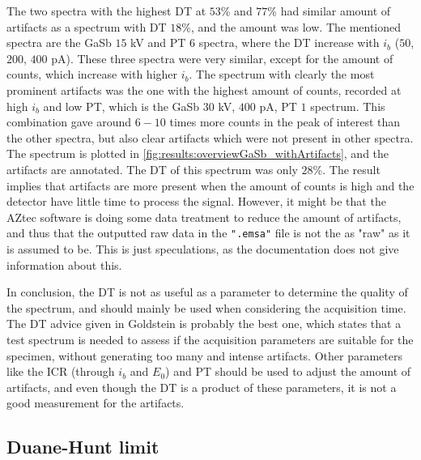 The two spectra with the highest DT at $53$\% and $77$\% had similar amount of artifacts as a spectrum with DT $18$\%, and the amount was low.
The mentioned spectra are the GaSb $15$ kV and PT $6$ spectra, where the DT increase with $i_b$ ($50$, $200$, $400$ pA).
These three spectra were very similar, except for the amount of counts, which increase with higher $i_b$.
The spectrum with clearly the most prominent artifacts was the one with the highest amount of counts, recorded at high $i_b$ and low PT, which is the GaSb $30$ kV, $400$ pA, PT $1$ spectrum.
This combination gave around $6-10$ times more counts in the peak of interest than the other spectra, but also clear artifacts which were not present in other spectra.
The spectrum is plotted in \cref{fig:results:overviewGaSb_withArtifacts}, and the artifacts are annotated.
The DT of this spectrum was only $28$\%.
The result implies that artifacts are more present when the amount of counts is high and the detector have little time to process the signal.
However, it might be that the AZtec software is doing some data treatment to reduce the amount of artifacts, and thus that the outputted raw data in the \verb|".emsa"| file is not the as "raw" as it is assumed to be.
This is just speculations, as the documentation \cite{aztec_manual} does not give information about this.


In conclusion, the DT is not as useful as a parameter to determine the quality of the spectrum, and should mainly be used when considering the acquisition time.
The DT advice given in Goldstein is probably the best one, which states that a test spectrum is needed to assess if the acquisition parameters are suitable for the specimen, without generating too many and intense artifacts.
Other parameters like the ICR (through $i_b$ and $E_0$) and PT should be used to adjust the amount of artifacts, and even though the DT is a product of these parameters, it is not a good measurement for the artifacts.



\subsection{Duane-Hunt limit}
\label{discussion:duane_hunt}

